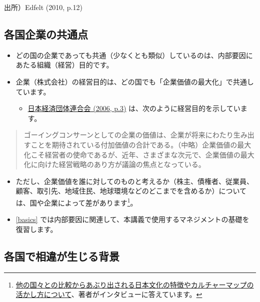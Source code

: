 \documentclass[
]{book}
\providecommand{\tightlist}{%
  \setlength{\itemsep}{0pt}\setlength{\parskip}{0pt}}
\begin{document}
出所）Edfelt (2010, p.12)

\hypertarget{common}{%
\subsection{各国企業の共通点}\label{common}}

\begin{itemize}
\item
  どの国の企業であっても共通（少なくとも類似）しているのは、内部要因にあたる組織（経営）目的です。
\item
  企業（株式会社）の経営目的は、どの国でも「企業価値の最大化」で共通しています。

  \begin{itemize}
  \tightlist
  \item
    \href{https://www.keidanren.or.jp/japanese/policy/2006/010/}{日本経済団体連合会 (2006, p.3)} は、次のように経営目的を示しています。
  \end{itemize}
\end{itemize}

\begin{quote}
ゴーイングコンサーンとしての企業の価値は、企業が将来にわたり生み出すことを期待されている付加価値の合計である。（中略）企業価値の最大化こそ経営者の使命であるが、近年、さまざまな次元で、企業価値の最大化に向けた経営戦略のあり方が議論の焦点となっている。
\end{quote}

\begin{itemize}
\tightlist
\item
  ただし、企業価値を誰に対してのものと考えるか（株主、債権者、従業員、顧客、取引先、地域住民、地球環境などのどこまでを含めるか）については、国や企業によって差があります\footnote{\href{https://plus.alc.co.jp/2018/01/meyer/}{他の国々との比較からあぶり出される日本文化の特徴やカルチャーマップの活かし方について}、著者がインタビューに答えています。}。
\end{itemize}

\begin{itemize}
\tightlist
\item
  \ref{basics} では内部要因に関連して、本講義で使用するマネジメントの基礎を復習します。
\end{itemize}

\hypertarget{difference}{%
\subsection{各国で相違が生じる背景}\label{difference}}
\end{document}
